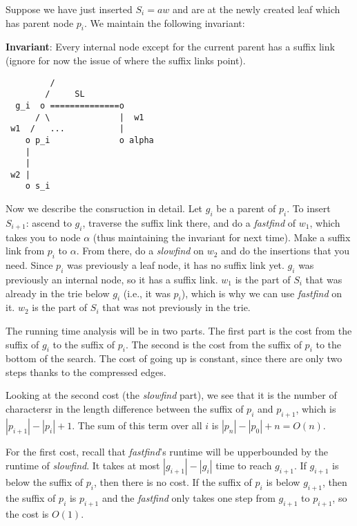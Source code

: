 \documentclass{article}
\begin{document}
Suppose we have just inserted $S_i = aw$ and are at the newly created
leaf which has parent node $p_i$.  We maintain the following invariant:

\newpage

\textbf{Invariant}: Every internal node except for the current parent
has a suffix link (ignore for now the issue of where the suffix links
point).

\begin{verbatim}
         /
        /     SL
  g_i  o ==============o
      / \              |  w1
 w1  /   ...           |
    o p_i              o alpha
    |
    |
 w2 |
    o s_i
\end{verbatim}

Now we describe the consruction in detail.  Let $g_i$ be a parent of
$p_i$.  To insert $S_{i+1}$: ascend to $g_i$, traverse the suffix link
there, and do a \emph{fastfind} of $w_1$, which takes you to node
$\alpha$ (thus maintaining the invariant for next time).  Make a
suffix link from $p_i$ to $\alpha$.  From there, do a \emph{slowfind}
on $w_2$ and do the insertions that you need.  Since $p_i$ was
previously a leaf node, it has no suffix link yet.  $g_i$ was
previously an internal node, so it has a suffix link.  $w_1$ is the
part of $S_i$ that was already in the trie below $g_i$ (i.e., it was
$p_i$), which is why we can use \emph{fastfind} on it.  $w_2$ is the
part of $S_i$ that was not previously in the trie.

The running time analysis will be in two parts.  The first part is the
cost from the suffix of $g_i$ to the suffix of $p_i$.  The second is the
cost from the suffix of $p_i$ to the bottom of the search.  The cost of
going up is constant, since there are only two steps thanks to the
compressed edges.

Looking at the second cost (the \emph{slowfind} part), we see that it is the
number of charactersr in the length difference between the suffix of
$p_i$ and $p_{i+1}$, which is $|p_{i+1}| - |p_i| + 1$.  The sum of this
term over all $i$ is $|p_n| - |p_0| + n = O(n)$.

For the first cost, recall that \emph{fastfind}'s runtime will be
upperbounded by the runtime of \emph{slowfind}.  It takes at most
$|g_{i+1}| - |g_i|$ time to reach $g_{i+1}$.  If $g_{i+1}$ is below the
suffix of $p_i$, then there is no cost.  If the suffix of $p_i$ is below
$g_{i+1}$, then the suffix of $p_i$ is $p_{i+1}$ and the
\emph{fastfind} only takes one step from $g_{i+1}$ to $p_{i+1}$, so
the cost is $O(1)$.
\end{document}
